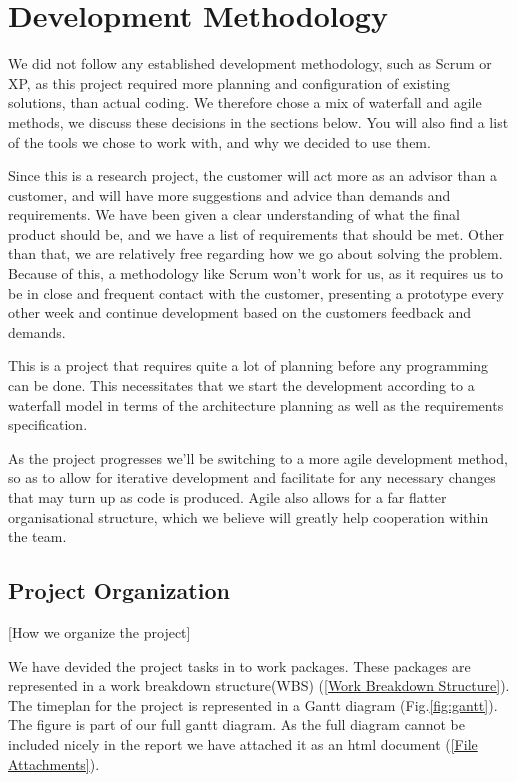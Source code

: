     
\section{Development Methodology}\label{Development Methodology} 
    We did not follow any established development methodology, such as Scrum or XP, as this project required more planning and configuration of existing solutions, than actual coding. We therefore chose a mix of waterfall and agile methods, we discuss these decisions in the sections below. You will also find a list of the tools we chose to work with, and why we decided to use them. 
    
    Since this is a research project, the customer will act more as an advisor than a customer, and will have more suggestions and advice than demands and requirements. We have been given a clear understanding of what the final product should be, and we have a list of requirements that should be met. Other than that, we are relatively free regarding how we go about solving the problem. Because of this, a methodology like Scrum won't work for us, as it requires us to be in close and frequent contact with the customer, presenting a prototype every other week and continue development based on the customers feedback and demands.
    
    This is a project that requires quite a lot of planning before any programming can be done. This necessitates that we start the development according to a waterfall model in terms of the architecture planning as well as the requirements specification.
    
    As the project progresses we’ll be switching to a more agile development method, so as to allow for iterative development and facilitate for any necessary changes that may turn up as code is produced. Agile also allows for a far flatter organisational structure, which we believe will greatly help cooperation within the team.

    \subsection{Project Organization}\label{Project Organization}[How we organize the project]
    
    We have devided the project tasks in to work packages. These packages are represented in a work breakdown structure(WBS) (\ref{Work Breakdown Structure}). The timeplan for the project is represented in a Gantt diagram (Fig.\ref{fig:gantt}). The figure is part of our full gantt diagram. As the full diagram cannot be included nicely in the report we have attached it as an html document (\ref{File Attachments}).
     
